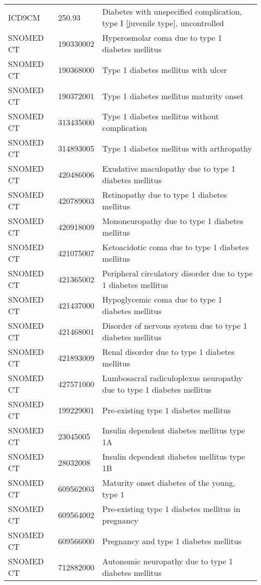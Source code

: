 \begin{longtable}{p{}p{}p{}}
  ICD9CM & 250.93 & Diabetes with unspecified complication, type I [juvenile type], uncontrolled \\ 
  SNOMED CT & 190330002 & Hyperosmolar coma due to type 1 diabetes mellitus \\ 
  SNOMED CT & 190368000 & Type 1 diabetes mellitus with ulcer \\ 
  SNOMED CT & 190372001 & Type 1 diabetes mellitus maturity onset \\ 
  SNOMED CT & 313435000 & Type 1 diabetes mellitus without complication \\ 
  SNOMED CT & 314893005 & Type 1 diabetes mellitus with arthropathy \\ 
  SNOMED CT & 420486006 & Exudative maculopathy due to type 1 diabetes mellitus \\ 
  SNOMED CT & 420789003 & Retinopathy due to type 1 diabetes mellitus \\ 
  SNOMED CT & 420918009 & Mononeuropathy due to type 1 diabetes mellitus \\ 
  SNOMED CT & 421075007 & Ketoacidotic coma due to type 1 diabetes mellitus \\ 
  SNOMED CT & 421365002 & Peripheral circulatory disorder due to type 1 diabetes mellitus \\ 
  SNOMED CT & 421437000 & Hypoglycemic coma due to type 1 diabetes mellitus \\ 
  SNOMED CT & 421468001 & Disorder of nervous system due to type 1 diabetes mellitus \\ 
  SNOMED CT & 421893009 & Renal disorder due to type 1 diabetes mellitus \\ 
  SNOMED CT & 427571000 & Lumbosacral radiculoplexus neuropathy due to type 1 diabetes mellitus \\ 
  SNOMED CT & 199229001 & Pre-existing type 1 diabetes mellitus \\ 
  SNOMED CT & 23045005 & Insulin dependent diabetes mellitus type 1A \\ 
  SNOMED CT & 28032008 & Insulin dependent diabetes mellitus type 1B \\ 
  SNOMED CT & 609562003 & Maturity onset diabetes of the young, type 1 \\ 
  SNOMED CT & 609564002 & Pre-existing type 1 diabetes mellitus in pregnancy \\ 
  SNOMED CT & 609566000 & Pregnancy and type 1 diabetes mellitus \\ 
  SNOMED CT & 712882000 & Autonomic neuropathy due to type 1 diabetes mellitus \\ 

\end{longtable}
